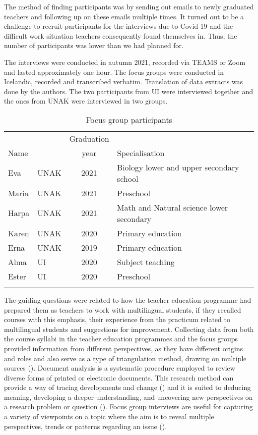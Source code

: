 \documentclass[output=paper]{langscibook}
\begin{document}
The method of finding participants was by sending out emails to newly graduated teachers and following up on these emails multiple times. It turned out to be a challenge to recruit participants for the interviews due to Covid-19 and the difficult work situation teachers consequently found themselves in. Thus, the number of participants was lower than we had planned for.

The interviews were conducted in autumn 2021, recorded via TEAMS or Zoom and lasted {approximately} one hour. The focus groups were conducted in Icelandic, recorded and transcribed verbatim. Translation of data extracts was done by the authors. The two participants from UI were interviewed together and the ones from UNAK were interviewed in two groups.


\begin{table}
\begin{tabularx}{\textwidth}{llcQ}
\lsptoprule
       &  & Graduation & \\
{Name} &  & {year} & {Specialisation}\\
\midrule
Eva   & UNAK & 2021 & Biology lower and upper secondary school \\
María & UNAK & 2021 & Preschool\\
Harpa & UNAK & 2021 & Math and Natural science lower secondary \\
Karen & UNAK & 2020 & Primary education\\
Erna  & UNAK & 2019 & Primary education \\
Alma  & UI & 2020 & Subject teaching\\
Ester & UI & 2020 & Preschool\\
\lspbottomrule
\end{tabularx}
\caption{Focus group participants}
\label{tab:gunnthorsdottira:1}
\end{table}

\begin{sloppypar}
The guiding questions were related to how the teacher education programme had prepared them as teachers to work with multilingual students, if they recalled courses with this emphasis, their experience from the practicum related to multilingual students and suggestions for improvement. Collecting data from both the course syllabi in the teacher education programmes and the focus groups provided information from different perspectives, as they have different origins and roles and also serve as a type of triangulation method, drawing on multiple sources (\citealt{Stake2000}). Document analysis is a systematic procedure employed to review diverse forms of printed or electronic documents. This research method can provide a way of tracing developments and change (\citealt{Bowen2009}) and it is suited to deducing meaning, developing a deeper understanding, and uncovering new perspectives on a research problem or question (\citealt{Merriam2009}). Focus group interviews are useful for capturing a variety of viewpoints on a topic where the aim is to reveal multiple perspectives, trends or patterns regarding an issue (\citealt{BrinkmannKvale2015}).
\end{sloppypar}
\end{document}
